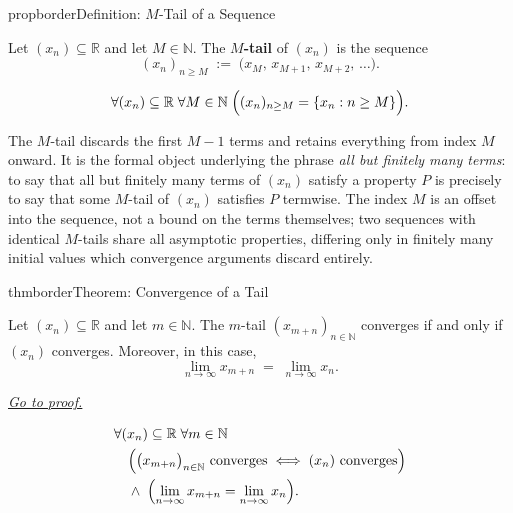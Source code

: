 \begin{bpnew}{propborder}{Definition: $M$-Tail of a Sequence}
\begin{definition}
\label{def:m-tail}

Let $(x_n) \subseteq \mathbb{R}$ and let $M \in \mathbb{N}$. The
\textbf{$M$-tail} of $(x_n)$ is the sequence
\[
    (x_n)_{n \ge M} \;:=\; \bigl(x_M,\, x_{M+1},\, x_{M+2},\, \ldots\bigr).
\]
\end{definition}
\end{bpnew}

\begin{remark*}
\[
\forall (x_n) \subseteq \mathbb{R} \;\forall M \in \mathbb{N}
\;\Bigl(
    (x_n)_{n \ge M} = \{x_n : n \ge M\}
\Bigr).
\]
\end{remark*}

\begin{remark*}[Interpretation]
The $M$-tail discards the first $M - 1$ terms and retains everything
from index $M$ onward. It is the formal object underlying the phrase
\emph{all but finitely many terms}: to say that all but finitely many
terms of $(x_n)$ satisfy a property $P$ is precisely to say that some
$M$-tail of $(x_n)$ satisfies $P$ termwise. The index $M$ is an offset
into the sequence, not a bound on the terms themselves; two sequences
with identical $M$-tails share all asymptotic properties, differing
only in finitely many initial values which convergence arguments
discard entirely.
\end{remark*}



\begin{bpnew}{thmborder}{Theorem: Convergence of a Tail}
\begin{theorem}
\label{thm:convergence-of-tail}

Let $(x_n) \subseteq \mathbb{R}$ and let $m \in \mathbb{N}$. The
$m$-tail $(x_{m+n})_{n \in \mathbb{N}}$ converges if and only if
$(x_n)$ converges. Moreover, in this case,
\[
    \lim_{n \to \infty} x_{m+n} \;=\; \lim_{n \to \infty} x_n.
\]

\smallskip
\noindent
\hyperref[prf:convergence-of-tail]{\textit{Go to proof.}}
\end{theorem}
\end{bpnew}

\begin{remark*}
\[
\begin{aligned}
&\forall (x_n) \subseteq \mathbb{R} \;\forall m \in \mathbb{N}\\
&\quad\Bigl(
    \bigl(x_{m+n}\bigr)_{n \in \mathbb{N}} \text{ converges}
    \;\Longleftrightarrow\;
    (x_n) \text{ converges}
\Bigr)\\
&\quad\land\;\Bigl(
    \lim_{n\to\infty} x_{m+n} = \lim_{n\to\infty} x_n
\Bigr).
\end{aligned}
\]
\end{remark*}

